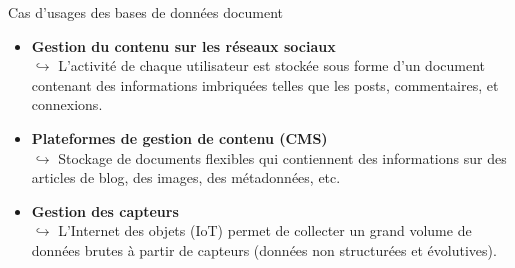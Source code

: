 \begin{frame}{Cas d'usages des bases de données document}

\begin{itemize}
    \item \textbf{Gestion du contenu sur les réseaux sociaux}\\
    $\hookrightarrow$ L'activité de chaque utilisateur est stockée sous forme d'un document contenant des informations imbriquées telles que les posts, commentaires, et connexions.
    \vspace{0.3cm}

    \item \textbf{Plateformes de gestion de contenu (CMS)}\\
    $\hookrightarrow$ Stockage de documents flexibles qui contiennent des informations sur des articles de blog, des images, des métadonnées, etc.
    \vspace{0.3cm}

    \item \textbf{Gestion des capteurs}\\
    $\hookrightarrow$ L'Internet des objets (IoT) permet de collecter un grand volume de données brutes à partir de capteurs (données non structurées et évolutives).
\end{itemize}
\end{frame}



